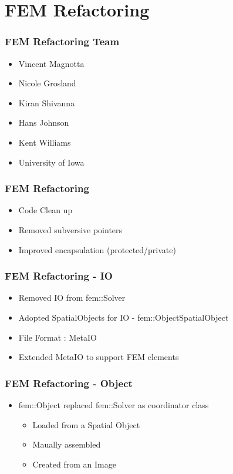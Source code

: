 \section{FEM Refactoring}




{
\begin{frame}
\frametitle{FEM Refactoring Team}
\large
\begin{itemize}
\item Vincent Magnotta
\item Nicole Grosland
\item Kiran Shivanna
\item Hans Johnson
\item Kent Williams
\item University of Iowa
\end{itemize}
\end{frame}
}


{
\begin{frame}
\frametitle{FEM Refactoring}
\large
\begin{itemize}
\item Code Clean up
\pause
\item Removed subversive pointers
\pause
\item Improved encapsulation (protected/private)
\end{itemize}
\end{frame}
}


{
\begin{frame}
\frametitle{FEM Refactoring - IO}
\large
\begin{itemize}
\item Removed IO from fem::Solver
\pause
\item Adopted SpatialObjects for IO - fem::ObjectSpatialObject
\pause
\item File Format : MetaIO
\pause
\item Extended MetaIO to support FEM elements
\end{itemize}
\end{frame}
}



{
\begin{frame}
\frametitle{FEM Refactoring - Object}
\large
\begin{itemize}
\item fem::Object replaced fem::Solver as coordinator class
\pause
\begin{itemize}
\item Loaded from a Spatial Object
\item Maually assembled
\item Created from an Image
\end{itemize}
\end{itemize}
\end{frame}
}



